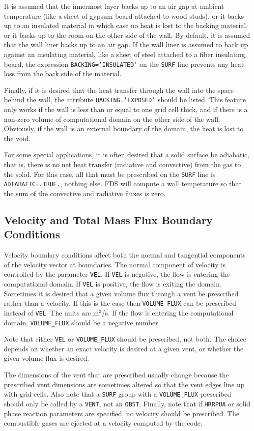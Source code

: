 \documentclass[11pt]{book}
\newcommand{\ct}{\tt\small}
\begin{document}
It is assumed that the innermost layer backs up to an air gap at ambient
temperature (like a sheet of gypsum board attached to wood studs), or
it backs up to an insulated material in which case no heat is lost to
the backing material, or it backs up to the room on the other side of
the wall. By default, it is assumed that the wall liner backs up to an air gap.
If the wall liner is assumed to back up against an insulating material,
like a sheet of steel attached to a fiber insulating board, the expression
{\ct BACKING='INSULATED'} on the {\ct SURF} line prevents any heat
loss from the back side of the material.

Finally, if it is desired that the heat transfer
through the wall into the space behind the wall, the attribute
{\ct BACKING='EXPOSED'} should be listed. This feature only works
if the wall is less than or equal to one grid cell thick, and if there is a non-zero volume
of computational domain on the other side of the wall. Obviously, if
the wall is an external boundary of the domain, the heat is lost
to the void.

For some special applications, it is often desired that a solid
surface be adiabatic, that is, there is no net heat transfer
(radiative and convective) from the gas to the solid. For this case,
all that must be prescribed on the {\ct SURF} line is {\ct
ADIABATIC=.TRUE.}, nothing else.  FDS will compute a wall temperature
so that the sum of the convective and radiative fluxes is zero.

\subsection{Velocity and Total Mass Flux Boundary Conditions}
 

Velocity boundary conditions affect both the normal and tangential
components of the velocity vector at boundaries.
The normal component of velocity is controlled by the parameter
{\ct VEL}. If {\ct VEL} is negative, the flow is entering the
computational domain. If {\ct VEL} is positive, the flow is exiting the
domain.
Sometimes it is desired that a given volume flux through a vent
be prescribed rather than a velocity. If this is the case then
{\ct VOLUME\_FLUX} can be prescribed instead of {\ct VEL}. The units
are m$^3$/s.
If the flow is entering the computational domain, {\ct VOLUME\_FLUX}
should be a negative number.
\begin{warning}
\noindent
Note that either {\ct VEL} or {\ct VOLUME\_FLUX} should be prescribed,
not both.  The choice depends on whether an exact velocity is desired at a
given vent, or whether the given volume flux is desired.
\end{warning}
The dimensions of the vent that are prescribed usually change
because the prescribed vent dimensions are sometimes altered so that
the vent edges line up with grid cells. Also note that a {\ct SURF}
group with a {\ct VOLUME\_FLUX} prescribed should only be called by a
{\ct VENT}, not an {\ct OBST}.
Finally, note that if {\ct HRRPUA} or solid phase reaction parameters are
specified, no velocity should be prescribed. The combustible gases
are ejected at a velocity computed by the code.
\end{document}
